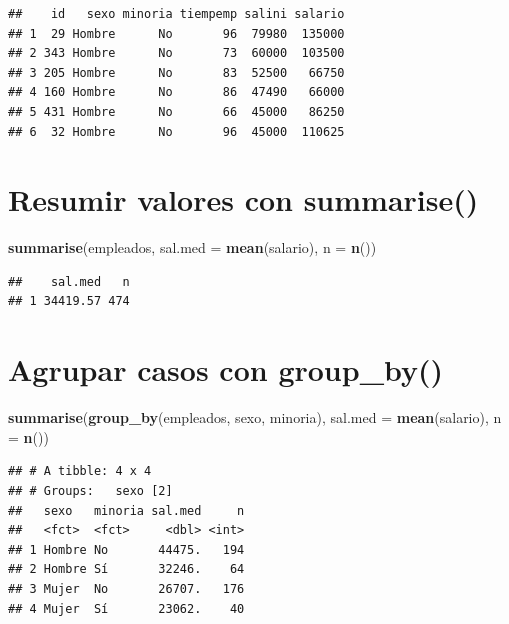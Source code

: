 \documentclass[]{book}
\newenvironment{Shaded}{\begin{snugshade}}{\end{snugshade}}
\newcommand{\KeywordTok}[1]{\textcolor[rgb]{0.13,0.29,0.53}{\textbf{#1}}}
\newcommand{\DataTypeTok}[1]{\textcolor[rgb]{0.13,0.29,0.53}{#1}}
\newcommand{\NormalTok}[1]{#1}
\begin{document}
\begin{verbatim}
##    id   sexo minoria tiempemp salini salario
## 1  29 Hombre      No       96  79980  135000
## 2 343 Hombre      No       73  60000  103500
## 3 205 Hombre      No       83  52500   66750
## 4 160 Hombre      No       86  47490   66000
## 5 431 Hombre      No       66  45000   86250
## 6  32 Hombre      No       96  45000  110625
\end{verbatim}

\section{\texorpdfstring{Resumir valores con
\textbf{summarise()}}{Resumir valores con summarise()}}\label{resumir-valores-con-summarise}

\begin{Shaded}
\begin{Highlighting}[]
\KeywordTok{summarise}\NormalTok{(empleados, }\DataTypeTok{sal.med =} \KeywordTok{mean}\NormalTok{(salario), }\DataTypeTok{n =} \KeywordTok{n}\NormalTok{())}
\end{Highlighting}
\end{Shaded}

\begin{verbatim}
##    sal.med   n
## 1 34419.57 474
\end{verbatim}

\section{\texorpdfstring{Agrupar casos con
\textbf{group\_by()}}{Agrupar casos con group\_by()}}\label{agrupar-casos-con-group_by}

\begin{Shaded}
\begin{Highlighting}[]
\KeywordTok{summarise}\NormalTok{(}\KeywordTok{group_by}\NormalTok{(empleados, sexo, minoria), }\DataTypeTok{sal.med =} \KeywordTok{mean}\NormalTok{(salario), }\DataTypeTok{n =} \KeywordTok{n}\NormalTok{())}
\end{Highlighting}
\end{Shaded}

\begin{verbatim}
## # A tibble: 4 x 4
## # Groups:   sexo [2]
##   sexo   minoria sal.med     n
##   <fct>  <fct>     <dbl> <int>
## 1 Hombre No       44475.   194
## 2 Hombre Sí       32246.    64
## 3 Mujer  No       26707.   176
## 4 Mujer  Sí       23062.    40
\end{verbatim}
\end{document}
